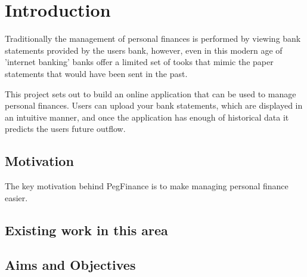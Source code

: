 \chapter{Introduction}

\begin{comment}
This chapter puts the work into context. Having read it, the reader should be left in no doubt as to:

- the topic area to which the work applies
- why the work is being done
- what else has been done in the area and by whom
 - how the author proposes to tackle the problem: The project proposal is often expressed in terms of a main objective and possibly one or more additional objectives. It is useful to define "milestones" or "sub-goals" that mark the progress towards the objectives. 
 - It is common to end this chapter with a brief overview of each of the subsequent chapters of the report.
\end{comment}

Traditionally the management of personal finances is performed by viewing bank statements provided by the users bank, however, even in this modern age of 'internet banking' banks offer a limited set of tooks that mimic the paper statements that would have been sent in the past.

This project sets out to build an online application that can be used to manage personal finances. Users can upload your bank statements, which are displayed in an intuitive manner, and once the application has enough of  historical data it predicts the users future outflow.

\section{Motivation}
The key motivation behind PegFinance is to make managing personal finance easier. 


\section{Existing work in this area}



\section{Aims and Objectives}

